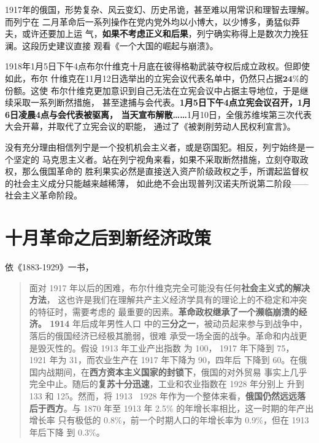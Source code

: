 1917年的俄国，形势复杂、风云变幻、历史吊诡，甚至难以用常识和理智去理解。而列宁在
二月革命后一系列操作在党内党外均以小博大，以少博多，勇猛似莽夫，或许还要加上运
气，\textbf{如果不考虑正义和后果}，列宁确实称得上是数次力挽狂澜。这段历史建议直接
观看《一个大国的崛起与崩溃》。

1918年1月5日下午4点布尔什维克十月底在彼得格勒武装夺权后成立政权。但即使如此，布尔
什维克在11月12日选举出的立宪会议代表名单中，仍然只占据$\mathbf{24\%}$的份额。这使
布尔什维克更加意识到自己无法在立宪会议中占据主导地位，于是继续采取一系列断然措施，
甚至逮捕与会代表。\textbf{1月5日下午4点立宪会议召开，1月6日凌晨4点与会代表被驱离，
  当天宣布解散……}1月10日，全俄苏维埃第三次代表大会开幕，并取代了立宪会议的职能，
通过了《被剥削劳动人民权利宣言》。

没有充分理由相信列宁是一个投机机会主义者，或是窃国犯。相反，列宁始终是一个坚定的
马克思主义者。站在列宁视角来看，如果不采取断然措施，立刻夺取政权，那么俄国革命的
胜利果实必然是直接送入资产阶级政权之手，所谓起监督权的社会主义成分只能越来越稀薄，
如此绝不会出现普列汉诺夫所说第二阶段——社会主义革命阶段。

\section{十月革命之后到新经济政策}
依《1883-1929》一书，
\begin{quotation}
  面对 1917 年以后的困难，布尔什维克完全可能没有任何\textbf{社会主义式的解决方法}，
  这也许是我们在理解共产主义经济学具有的理论上的不稳定和冲突的特征时，需要考虑的
  最重要的因素。\textbf{革命政权继承了一个濒临崩溃的经济。 1914} 年后成年男性人口
  中的\textbf{三分之一}，被动员起来参与到战争中，落后的俄国经济已经极其脆弱，很难
  承受一场全面的战争。革命和内战更是毁灭性的。假设 1913 年工业产出指数
  为 100， 1917 年下降到 75， 1921 年为 31，而农业生产在 1917 年下降为 90，四年后
  下降到 60。在俄国内战期间，在\textbf{西方资本主义国家的封锁下}，俄国的对外贸易
  事实上几乎完全中止。随后的\textbf{复苏十分迅速}，工业和农业指数在 1928 年分别上
  升到 133 和 125。然而，将 1913~ 1928 年作为一个整体来看，\textbf{俄国仍然远远落
    后于西方}。与 1870 年至 1913 年 2.5\% 的年增长率相比，这一时期的年产出增长率
  只有极低的 0.8\%，前一个时期人口的年增长率为 0.9\%，但在 1913 年后下降
  到 0.3\%。
\end{quotation}

